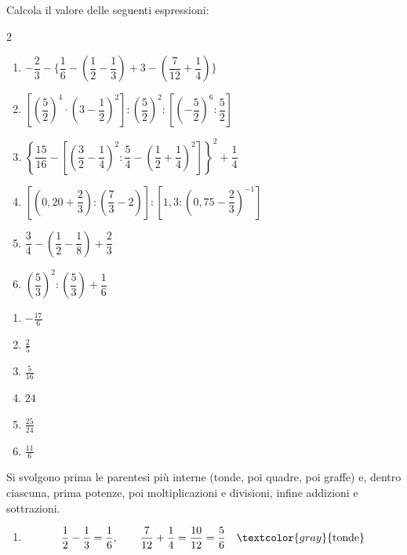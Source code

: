 \begin{question}[ID=2.1, subtitle={Calcolo di espressioni frazionarie — serie 1}, tags={espressioni, frazionarie}, difficulty=facile]
Calcola il valore delle seguenti espressioni:
\begin{multicols}{2}
\begin{enumerate}[leftmargin=3.2cm]
    \item $-\dfrac{2}{3} -\Biggl\{ \dfrac{1}{6} -\left(\dfrac{1}{2}-\dfrac{1}{3}\right) +3 -\left(\dfrac{7}{12}+\dfrac{1}{4}\right) \Biggr\}$
    \item $\left[ \left(\dfrac{5}{2}\right)^{4} \cdot \left(3-\dfrac{1}{2}\right)^{2} \right] :\left(\dfrac{5}{2}\right)^{2} :\left[ \left(-\dfrac{5}{2}\right)^{6} :\dfrac{5}{2} \right]$
    \item $\left\{ \dfrac{15}{16} - \left[ \left(\dfrac{3}{2}-\dfrac14\right)^{2} :\dfrac{5}{4} - \left(\dfrac12+\dfrac14\right)^{2} \right] \right\}^{2} +\dfrac14$
    \item $\left[ \left(0{,}20+\dfrac{2}{3}\right) : \left(\dfrac{7}{3}-2\right) \right] : \left[ 1{,}3 : \left(0{,}75-\dfrac{2}{3}\right)^{-1} \right]$
    \item $\dfrac{3}{4}-\left(\dfrac{1}{2}-\dfrac{1}{8}\right)+\dfrac{2}{3}$
    \item $\left(\dfrac{5}{3}\right)^2:\left(\dfrac{5}{3}\right)+\dfrac{1}{6}$
\end{enumerate}
\end{multicols}
\begin{solution}
\begin{enumerate}
    \item $-\tfrac{17}{6}$
    \item $\tfrac25$
    \item $\tfrac{5}{16}$
    \item $24$
    \item $\tfrac{25}{24}$
    \item $\tfrac{11}{6}$
\end{enumerate}
\end{solution}
\begin{explanation}
Si svolgono prima le parentesi più interne (tonde, poi quadre, poi graffe) e, dentro ciascuna, prima potenze, poi moltiplicazioni e divisioni, infine addizioni e sottrazioni.
\begin{enumerate}
    \item \[\begin{aligned}
    \dfrac12-\dfrac13 &= \dfrac16, \qquad \dfrac7{12}+\dfrac14=\dfrac{10}{12}=\dfrac56 && \textcolor{gray}{\text{tonde}}\\

\end{aligned}\]
\end{enumerate}
\end{explanation}
\end{question}
